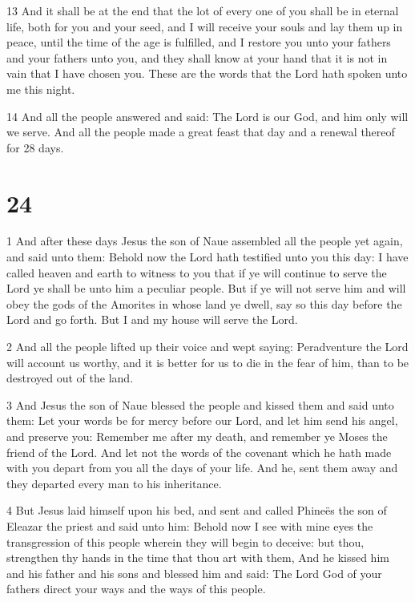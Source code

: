 \par 13 And it shall be at the end that the lot of every one of you shall be in eternal life, both for you and your seed, and I will receive your souls and lay them up in peace, until the time of the age is fulfilled, and I restore you unto your fathers and your fathers unto you, and they shall know at your hand that it is not in vain that I have chosen you. These are the words that the Lord hath spoken unto me this night. 

\par 14 And all the people answered and said: The Lord is our God, and him only will we serve. And all the people made a great feast that day and a renewal thereof for 28 days.

\chapter{24}

\par 1 And after these days Jesus the son of Naue assembled all the people yet again, and said unto them: Behold now the Lord hath testified unto you this day: I have called heaven and earth to witness to you that if ye will continue to serve the Lord ye shall be unto him a peculiar people. But if ye will not serve him and will obey the gods of the Amorites in whose land ye dwell, say so this day before the Lord and go forth. But I and my house will serve the Lord. 

\par 2 And all the people lifted up their voice and wept saying: Peradventure the Lord will account us worthy, and it is better for us to die in the fear of him, than to be destroyed out of the land.

\par 3 And Jesus the son of Naue blessed the people and kissed them and said unto them: Let your words be for mercy before our Lord, and let him send his angel, and preserve you: Remember me after my death, and remember ye Moses the friend of the Lord. And let not the words of the covenant which he hath made with you depart from you all the days of your life. And he, sent them away and they departed every man to his inheritance.

\par 4 But Jesus laid himself upon his bed, and sent and called Phineës the son of Eleazar the priest and said unto him: Behold now I see with mine eyes the transgression of this people wherein they will begin to deceive: but thou, strengthen thy hands in the time that thou art with them, And he kissed him and his father and his sons and blessed him and said: The Lord God of your fathers direct your ways and the ways of this people. 

